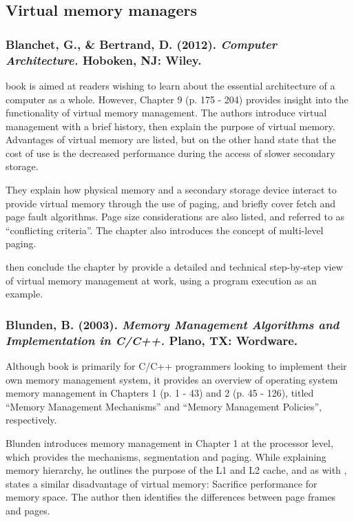 \subsection{Virtual memory managers}

\subsubsection*{Blanchet, G., \& Bertrand, D. (2012). \emph{Computer Architecture.} Hoboken, NJ: Wiley.}

 book is aimed at readers wishing to learn about the essential architecture of a computer as a whole. However, Chapter 9 (p. 175 - 204) provides insight into the functionality of virtual memory management. The authors introduce virtual management with a brief history, then explain the purpose of virtual memory. Advantages of virtual memory are listed, but on the other hand state that the cost of use is the decreased performance during the access of slower secondary storage.

They explain how physical memory and a secondary storage device interact to provide virtual memory through the use of paging, and briefly cover fetch and page fault algorithms. Page size considerations are also listed, and referred to as ``conflicting criteria''. The chapter also introduces the concept of multi-level paging.

\citet{Blanchet2012} then conclude the chapter by provide a detailed and technical step-by-step view of virtual memory management at work, using a program execution as an example.

\subsubsection*{Blunden, B. (2003). \emph{Memory Management Algorithms and Implementation in C/C++.} Plano, TX: Wordware.}

Although  book is primarily for C/C++ programmers looking to implement their own memory management system, it provides an overview of operating system memory management in Chapters 1 (p. 1 - 43) and 2 (p. 45 - 126), titled ``Memory Management Mechanisms'' and ``Memory Management Policies'', respectively.

Blunden introduces memory management in Chapter 1 at the processor level, which provides the mechanisms, segmentation and paging. While explaining memory hierarchy, he outlines the purpose of the L1 and L2 cache, and as with \citet{Blanchet2012}, states a similar disadvantage of virtual memory: Sacrifice performance for memory space. The author then identifies the differences between page frames and pages.

